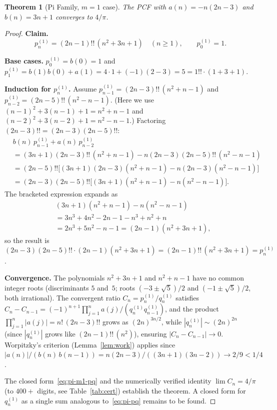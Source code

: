 \documentclass[11pt,a4paper]{article}
\theoremstyle{plain}
\newtheorem{theorem}{Theorem}
\theoremstyle{remark}
\begin{document}
\begin{theorem}[Pi Family, $m=1$ case]\label{thm:pi-m1}
The PCF with $a(n) = -n(2n{-}3)$ and $b(n) = 3n{+}1$ converges to $4/\pi$.
\end{theorem}

\begin{proof}
\textbf{Claim.}
\begin{equation}\label{eq:pi-m1-pq}
  p_n^{(1)} = (2n{-}1)!!\,(n^2{+}3n{+}1) \quad (n \ge 1),
  \qquad p_0^{(1)} = 1.
\end{equation}

\textbf{Base cases.}
$p_0^{(1)} = b(0) = 1$ and $p_1^{(1)} = b(1)b(0) + a(1) = 4\cdot 1 + (-1)(2{-}3) = 5
= 1!!\cdot(1{+}3{+}1)$.

\medskip\noindent\textbf{Induction for $p_n^{(1)}$.}
Assume $p_{n-1}^{(1)} = (2n{-}3)!!\,(n^2{+}n{-}1)$ and
$p_{n-2}^{(1)} = (2n{-}5)!!\,(n^2{-}n{-}1)$.
(Here we use $(n{-}1)^2{+}3(n{-}1){+}1 = n^2{+}n{-}1$
and $(n{-}2)^2{+}3(n{-}2){+}1 = n^2{-}n{-}1$.)
Factoring $(2n{-}3)!! = (2n{-}3)(2n{-}5)!!$:
\begin{align*}
  &b(n)\,p_{n-1}^{(1)} + a(n)\,p_{n-2}^{(1)} \\
  &= (3n{+}1)(2n{-}3)!!\,(n^2{+}n{-}1) - n(2n{-}3)(2n{-}5)!!\,(n^2{-}n{-}1) \\
  &= (2n{-}5)!!\bigl[(3n{+}1)(2n{-}3)(n^2{+}n{-}1)
     - n(2n{-}3)(n^2{-}n{-}1)\bigr] \\
  &= (2n{-}3)(2n{-}5)!!\bigl[(3n{+}1)(n^2{+}n{-}1)
     - n(n^2{-}n{-}1)\bigr].
\end{align*}
The bracketed expression expands as
\begin{align*}
  &(3n{+}1)(n^2{+}n{-}1) - n(n^2{-}n{-}1) \\
  &= 3n^3{+}4n^2{-}2n{-}1 - n^3{+}n^2{+}n \\
  &= 2n^3{+}5n^2{-}n{-}1 = (2n{-}1)(n^2{+}3n{+}1),
\end{align*}
so the result is
$(2n{-}3)(2n{-}5)!!\cdot(2n{-}1)(n^2{+}3n{+}1) = (2n{-}1)!!\,(n^2{+}3n{+}1)
= p_n^{(1)}$.

\medskip\noindent\textbf{Convergence.}
The polynomials $n^2{+}3n{+}1$ and $n^2{+}n{-}1$ have no common integer roots
(discriminants $5$ and~$5$; roots $(-3{\pm}\sqrt{5})/2$
and $(-1{\pm}\sqrt{5})/2$, both irrational).
The convergent ratio
$C_n = p_n^{(1)}/q_n^{(1)}$
satisfies
$C_n - C_{n-1} = (-1)^{n+1}\prod_{j=1}^n a(j) / (q_n^{(1)} q_{n-1}^{(1)})$,
and the product $\prod_{j=1}^n |a(j)| = n!\,(2n{-}3)!!$
grows as $(2n)^{3n/2}$, while $|q_n^{(1)}| \sim (2n)^{2n}$
(since $|q_n^{(1)}|$ grows like $(2n{-}1)!!\,(n^2)$),
ensuring $|C_n - C_{n-1}| \to 0$.
Worpitzky's criterion (Lemma~\ref{lem:work}) applies
since $|a(n)|/(b(n)\,b(n{-}1)) = n(2n{-}3)/((3n{+}1)(3n{-}2)) \to 2/9 < 1/4$.

The closed form~\eqref{eq:pi-m1-pq} and the numerically verified identity
$\lim C_n = 4/\pi$ (to $400{+}$ digits, see Table~\ref{tab:cert})
establish the theorem.
A closed form for $q_n^{(1)}$ as a single sum analogous to~\eqref{eq:pi-pq}
remains to be found.
\end{proof}
\end{document}
